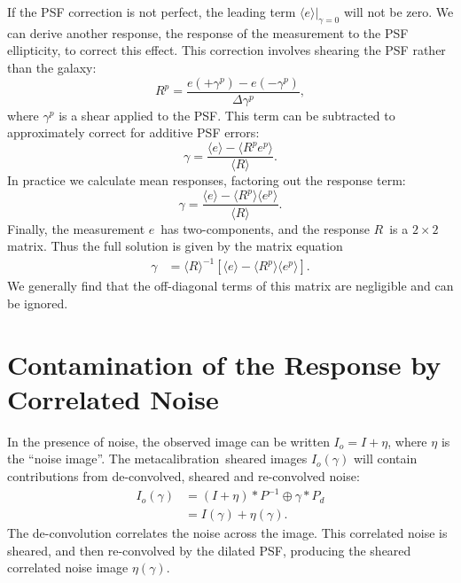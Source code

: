 \documentclass[usegraphicx,usenatbib]{mn2e}
\newcommand{\est}{$e$}
\newcommand{\mest}{e}
\newcommand{\mcal}{metacalibration}
\newcommand{\mcalR}{$R$}
\newcommand{\mcalRpsf}{$R^{p}$}
\begin{document}
If the PSF correction is not perfect, the leading term $\langle \mest \rangle|_{\gamma=0}$
will not be zero.  We can derive another response, the response of the
measurement to the PSF ellipticity, to correct this effect.  This
correction involves shearing the PSF rather than the galaxy:
\begin{equation}
    \mbox{\mcalRpsf} = \frac{\mest(+\gamma^{p}) - \mest(-\gamma^{p})}{\Delta \gamma^{p}},
\end{equation}
where $\gamma^{p}$ is a shear applied to the PSF.  
This term can be subtracted to approximately correct for additive PSF errors:
\begin{equation}
    \gamma = \frac{\langle \mest \rangle - \langle \mbox{\mcalRpsf} e^{p} \rangle}{ \langle \mbox{\mcalR} \rangle}.
\end{equation}
In practice we calculate mean responses, factoring out the response term:
\begin{equation}
    \gamma = \frac{\langle \mest \rangle - \langle \mbox{\mcalRpsf} \rangle \langle e^{p} \rangle}{ \langle \mbox{\mcalR} \rangle}.
\end{equation}
Finally, the measurement \est\ has two-components, and the response \mcalR\ is
a $2 \times 2$ matrix. Thus the full solution is given by the matrix
equation
\begin{align}
    \gamma &= 
    \langle \mbox{\mcalR} \rangle^{-1} \left[ \langle \mest \rangle - \langle \mbox{\mcalRpsf} \rangle \langle e^{p} \rangle \right].
\end{align}
We generally find that the off-diagonal terms of this matrix are negligible
and can be ignored.

\section{Contamination of the Response by Correlated Noise} \label{sec:contam}

In the presence of noise, the observed image can be written $I_o=I+\eta$, where $\eta$
is the ``noise image''.  The \mcal\ sheared images $I_o(\gamma)$ will contain
contributions from de-convolved, sheared and re-convolved noise:
\begin{align}
    I_{o}(\gamma) &= (I + \eta) \ast P^{-1} \oplus \gamma \ast P_{d} \nonumber \\
    &= I(\gamma) + \eta(\gamma).
\end{align}
The de-convolution correlates the noise
across the image.  This correlated noise is sheared, and then re-convolved by
the dilated PSF, producing the sheared correlated noise image $\eta(\gamma)$.
\end{document}
